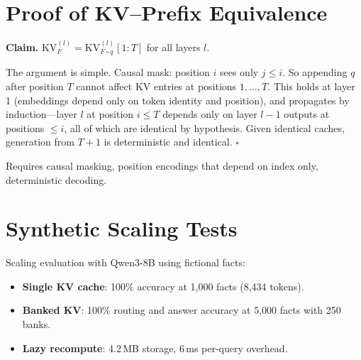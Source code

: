 \documentclass{article}
\begin{document}
\section{Proof of KV--Prefix Equivalence}
\label{app:proof}

\textbf{Claim.} $\text{KV}^{(l)}_F = \text{KV}^{(l)}_{F \circ q}[1{:}T]$ for all layers $l$.

The argument is simple. Causal mask: position $i$ sees only $j \leq i$. So appending $q$ after position $T$ cannot affect KV entries at positions $1, \ldots, T$. This holds at layer 1 (embeddings depend only on token identity and position), and propagates by induction---layer $l$ at position $i \leq T$ depends only on layer $l{-}1$ outputs at positions $\leq i$, all of which are identical by hypothesis. Given identical caches, generation from $T{+}1$ is deterministic and identical. $\square$

Requires causal masking, position encodings that depend on index only, deterministic decoding.

\section{Synthetic Scaling Tests}
\label{app:scaling}

Scaling evaluation with Qwen3-8B using fictional facts:
\begin{itemize}
    \item \textbf{Single KV cache}: 100\% accuracy at 1{,}000 facts (8{,}434 tokens).
    \item \textbf{Banked KV}: 100\% routing and answer accuracy at 5{,}000 facts with 250 banks.
    \item \textbf{Lazy recompute}: 4.2\,MB storage, 6\,ms per-query overhead.
\end{itemize}
\end{document}
